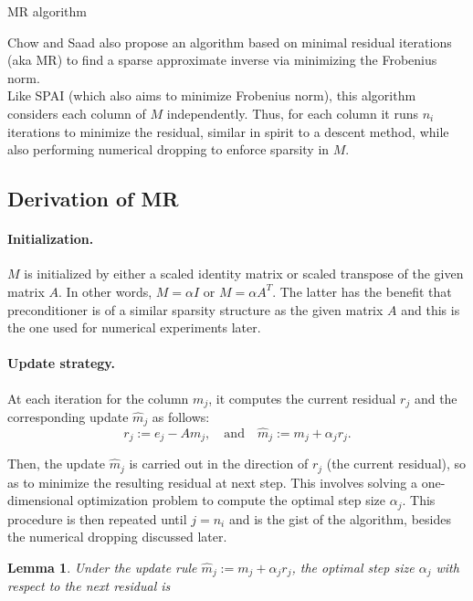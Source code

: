 \documentclass[paper=A4, fontsize=11pt]{scrartcl}
\newtheorem{lemma}{Lemma}[section]
\theoremstyle{remark}
\begin{document}
\begin{section}{MR algorithm}
	
	Chow and Saad \cite{chow} also propose an algorithm based on minimal residual iterations (aka MR) to find a sparse approximate inverse via minimizing the Frobenius norm.\\
	
	Like SPAI \cite{grote} (which also aims to minimize Frobenius norm), this algorithm considers each column of $M$ independently. Thus, for each column it runs $n_{i}$ iterations to minimize the residual, similar in spirit to a descent method, while also performing numerical dropping to enforce sparsity in $M$. 
	
	\subsection{Derivation of MR}
	
	\paragraph{Initialization.}
	$M$ is initialized by either a scaled identity matrix or scaled transpose of the given matrix $A$. In other words, $M = \alpha I$ or $M =\alpha A^{T}$. The latter has the benefit that preconditioner is of a similar sparsity structure as the given matrix $A$ and this is the one used for numerical experiments later.  
	
	\paragraph{Update strategy.}
	At each iteration for the column $m_{j}$, it computes the current residual $r_j$ and the corresponding update  $\hat{m}_{j}$ as follows:
	\begin{equation}
	r_{j} :=e_{j}-A m_{j}, \quad \text{and} \quad \hat{m}_{j} :=m_{j}+\alpha_{j} r_{j}.
	\end{equation}

	Then, the update $\hat{m}_{j}$ is carried out in the direction of $r_j$ (the current residual), so as to minimize the resulting residual at next step. This involves solving a one-dimensional optimization problem to compute the optimal step size $\alpha_{j}$. This procedure is then repeated until $j = n_{i}$ and  is the gist of the algorithm, besides the numerical dropping discussed later. 
	
	\begin{lemma}
Under the update rule $\hat{m}_{j} :=m_{j}+\alpha_{j} r_{j}$, 	the optimal step size $\alpha_{j}$ with respect to the next residual is 
	

\end{lemma}
\end{section}
\end{document}
